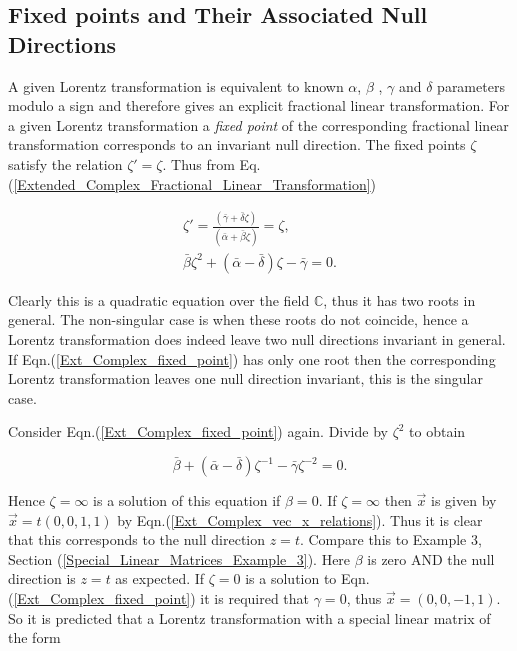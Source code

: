 \subsection{Fixed points and Their Associated Null Directions}

A given Lorentz transformation is equivalent to known $\alpha$, $\beta$ , $\gamma$ and $\delta$ parameters modulo a sign and therefore gives an explicit fractional linear transformation. For a given Lorentz transformation a \textit{fixed point} of the corresponding fractional linear transformation corresponds to an invariant null direction. The fixed points $\zeta$ satisfy the relation $\zeta' = \zeta$. Thus from Eq.(\ref{Extended_Complex_Fractional_Linear_Transformation})

\begin{gather}\nonumber
\zeta' = \frac{(\bar{\gamma} + \bar{\delta}\zeta)}{(\bar{\alpha} + \bar{\beta}\zeta)} = \zeta, \\\label{Ext_Complex_fixed_point}
\bar{\beta}\zeta^2 + (\bar{\alpha}- \bar{\delta})\zeta - \bar{\gamma} = 0. 
\end{gather}

\noindent Clearly this is a quadratic equation over the field $\mathbb{C}$, thus it has two roots in general. The non-singular case is when these roots do not coincide, hence a Lorentz transformation does indeed leave two null directions invariant in general.  If Eqn.(\ref{Ext_Complex_fixed_point}) has only one root then the corresponding Lorentz transformation leaves one null direction invariant, this is the singular case.

Consider Eqn.(\ref{Ext_Complex_fixed_point}) again. Divide by $\zeta^2$ to obtain

\begin{equation*}
\bar{\beta} + (\bar{\alpha}- \bar{\delta})\zeta^{-1} - \bar{\gamma}\zeta^{-2} = 0.
\end{equation*}

\noindent Hence $\zeta = \infty$ is a solution of this equation if $\beta = 0$. If $\zeta = \infty$ then $\vec{x}$ is given by $\vec{x} = t(0,0,1,1)$ by Eqn.(\ref{Ext_Complex_vec_x_relations}). Thus it is clear that this corresponds to the null direction $z=t$. Compare this to Example 3, Section (\ref{Special_Linear_Matrices_Example_3}). Here $\beta$ is zero AND the null direction is $z=t$ as expected. If $\zeta = 0$ is a solution to Eqn.(\ref{Ext_Complex_fixed_point}) it is required that $\gamma = 0$, thus $\vec{x} = (0,0,-1,1)$. So it is predicted that a Lorentz transformation with a special linear matrix of the form

